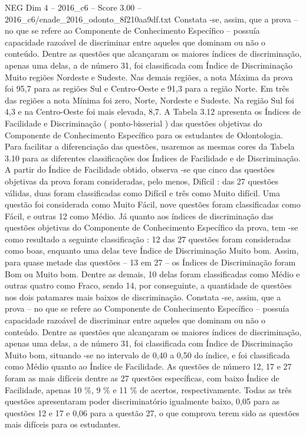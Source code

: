 \begin{textsample}{NEG Dim 4 – 2016\_c6 – Score 3.00 – 2016\_c6/enade\_2016\_odonto\_8f210aa9df.txt}
Constata -se, assim, que a prova – no que se refere ao Componente de Conhecimento Específico – possuía capacidade razoável de discriminar entre aqueles que dominam ou não o conteúdo.
Dentre as questões que alcançaram os maiores índices de discriminação, apenas uma delas, a de número 31, foi classificada com Índice de Discriminação Muito regiões Nordeste e Sudeste.
Nas demais regiões, a nota Máxima da prova foi 95,7 para as regiões Sul e Centro-Oeste e 91,3 para a região Norte.
Em três das regiões a nota Mínima foi zero, Norte, Nordeste e Sudeste.
Na região Sul foi 4,3 e na Centro-Oeste foi mais elevada, 8,7.
A Tabela 3.12 apresenta os Índices de Facilidade e Discriminação ( ponto-bisserial ) das questões objetivas do Componente de Conhecimento Específico para os estudantes de Odontologia.
Para facilitar a diferenciação das questões, usaremos as mesmas cores da Tabela 3.10 para as diferentes classificações dos Índices de Facilidade e de Discriminação.
A partir do Índice de Facilidade obtido, observa -se que cinco das questões objetivas da prova foram consideradas, pelo menos, Difícil : das 27 questões válidas, duas foram classificadas como Difícil e três como Muito difícil.
Uma questão foi considerada como Muito Fácil, nove questões foram classificadas como Fácil, e outras 12 como Médio.
Já quanto aos índices de discriminação das questões objetivas do Componente de Conhecimento Específico da prova, tem -se como resultado a seguinte classificação : 12 das 27 questões foram consideradas como boas, enquanto uma delas teve Índice de Discriminação Muito bom.
Assim, para quase metade das questões – 13 em 27 – os Índices de Discriminação foram Bom ou Muito bom.
Dentre as demais, 10 delas foram classificadas como Médio e outras quatro como Fraco, sendo 14, por conseguinte, a quantidade de questões nos dois patamares mais baixos de discriminação.
Constata -se, assim, que a prova – no que se refere ao Componente de Conhecimento Específico – possuía capacidade razoável de discriminar entre aqueles que dominam ou não o conteúdo.
Dentre as questões que alcançaram os maiores índices de discriminação, apenas uma delas, a de número 31, foi classificada com Índice de Discriminação Muito bom, situando -se no intervalo de 0,40 a 0,50 do índice, e foi classificada como Médio quanto ao Índice de Facilidade.
As questões de número 12, 17 e 27 foram as mais difíceis dentre as 27 questões específicas, com baixo Índice de Facilidade, apenas 10 \%, 9 \% e 11 \% de acertos, respectivamente.
Todas as três questões apresentaram poder discriminatório igualmente baixo, 0,05 para as questões 12 e 17 e 0,06 para a questão 27, o que comprova terem sido as questões mais difíceis para os estudantes.

\end{textsample}
